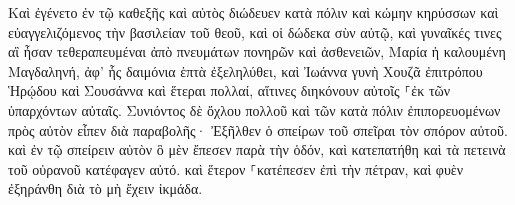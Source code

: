 \documentclass{openreader}
\begin{document}
Καὶ ἐγένετο ἐν τῷ καθεξῆς καὶ αὐτὸς διώδευεν κατὰ πόλιν καὶ κώμην κηρύσσων καὶ εὐαγγελιζόμενος τὴν βασιλείαν τοῦ θεοῦ, καὶ οἱ δώδεκα σὺν αὐτῷ, 
καὶ γυναῖκές τινες αἳ ἦσαν τεθεραπευμέναι ἀπὸ πνευμάτων πονηρῶν καὶ ἀσθενειῶν, Μαρία ἡ καλουμένη Μαγδαληνή, ἀφ’ ἧς δαιμόνια ἑπτὰ ἐξεληλύθει, 
καὶ Ἰωάννα γυνὴ Χουζᾶ ἐπιτρόπου Ἡρῴδου καὶ Σουσάννα καὶ ἕτεραι πολλαί, αἵτινες διηκόνουν αὐτοῖς ⸀ἐκ τῶν ὑπαρχόντων αὐταῖς. 
Συνιόντος δὲ ὄχλου πολλοῦ καὶ τῶν κατὰ πόλιν ἐπιπορευομένων πρὸς αὐτὸν εἶπεν διὰ παραβολῆς· 
Ἐξῆλθεν ὁ σπείρων τοῦ σπεῖραι τὸν σπόρον αὐτοῦ. καὶ ἐν τῷ σπείρειν αὐτὸν ὃ μὲν ἔπεσεν παρὰ τὴν ὁδόν, καὶ κατεπατήθη καὶ τὰ πετεινὰ τοῦ οὐρανοῦ κατέφαγεν αὐτό. 
καὶ ἕτερον ⸀κατέπεσεν ἐπὶ τὴν πέτραν, καὶ φυὲν ἐξηράνθη διὰ τὸ μὴ ἔχειν ἰκμάδα. 
\end{document}
